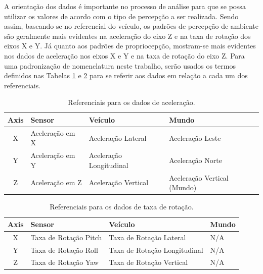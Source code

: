 A orientação dos dados é importante no processo de análise para que se possa utilizar os valores de acordo com o tipo de percepção a ser realizada. Sendo assim, baseando-se no referencial do veículo, os padrões de percepção de ambiente são geralmente mais evidentes na aceleração do eixo Z e na taxa de rotação dos eixos X e Y. Já quanto aos padrões de propriocepção, mostram-se mais evidentes nos dados de aceleração nos eixos X e Y e na taxa de rotação do eixo Z. Para uma padronização de nomenclatura neste trabalho, serão usados os termos definidos nas Tabelas \ref{table:accelerometer_reference_frames} e \ref{table:gyroscope_reference_frames} para se referir aos dados em relação a cada um dos referenciais.

\begin{table}[h]
    \caption{Referenciais para os dados de aceleração.}
    \label{table:accelerometer_reference_frames}
    \centering
    \small
    \begin{tabular}{clll}
        \toprule
        \textbf{Axis} & \textbf{Sensor} & \textbf{Veículo} & \textbf{Mundo} \\
        \toprule
        X & Aceleração em X & Aceleração Lateral & Aceleração Leste \\
        \midrule
        Y & Aceleração em Y & Aceleração Longitudinal & Aceleração Norte \\
        \midrule
        Z & Aceleração em Z & Aceleração Vertical & Aceleração Vertical (Mundo) \\
        \bottomrule
    \end{tabular}
\end{table}

\begin{table}[h]
    \caption{Referenciais para os dados de taxa de rotação.}
    \label{table:gyroscope_reference_frames}
    \centering
    \small
    \begin{tabular}{clll}
        \toprule
        \textbf{Axis} & \textbf{Sensor} & \textbf{Veículo} & \textbf{Mundo} \\
        \toprule
        X & Taxa de Rotação Pitch & Taxa de Rotação Lateral & N/A \\
        \midrule
        Y & Taxa de Rotação Roll & Taxa de Rotação Longitudinal & N/A \\
        \midrule
        Z & Taxa de Rotação Yaw & Taxa de Rotação Vertical & N/A \\
        \bottomrule
    \end{tabular}
\end{table}

